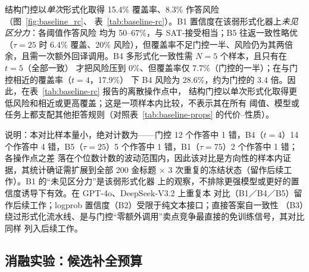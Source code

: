 \documentclass[letterpaper]{article}
\begin{document}
\begin{table}[ht]
  \centering
  \caption{代表性操作点（GPT-4o-mini，78 金标）。“样本”为所需形式化次数。}
  \label{tab:baseline-rc}
  \small
\end{table}

结构门控以\emph{单次}形式化取得 15.4\% 覆盖率、8.3\% 作答风险（图~\ref{fig:baseline_rc}、
表~\ref{tab:baseline-rc}）。B1 置信度在该弱形式化器上\emph{未见区分力}：各阈值作答风险
均为 50--67\%，与 SAT-接受相当；B5 往返一致性略优（$\tau{=}25$ 时 6.4\% 覆盖、20\%
风险），但覆盖率不足门控一半、风险仍为其两倍余，且需一次额外回译调用。B4 多形式化一致性需
$N=5$ 个样本，且只有在 $t=5$（全部一致）
才把风险压到 0\%、但覆盖率仅 7.7\%（门控的一半）；在与门控相近的覆盖率（$t=4$，17.9\%）
下 B4 风险为 28.6\%，约为门控的 3.4 倍。因此，在表~\ref{tab:baseline-rc} 报告的离散操作点中，
结构门控以单次形式化取得更低风险和相近或更高覆盖；这是一项样本内比较，不表示其在所有
阈值、模型或任务上都支配其他拒答规则（对照表~\ref{tab:baseline-props} 的代价--性质）。

说明：本对比样本量小，绝对计数为——门控 12 个作答中 1 错，B4（$t{=}4$）14 个作答中
4 错，B5（$\tau{=}25$）5 个作答中 1 错，B1（$\tau{=}75$）2 个作答中 1 错；各操作点之差
落在个位数计数的波动范围内，因此该对比是方向性的样本内证据，其统计确证需扩展到全部
200 金标题 $\times$ 3 次重复的冻结状态（留作后续工作）。B1 的“未见区分力”是该弱形式化器
上的观察，不排除更强模型或更好的置信度诱导下有效。在 GPT-4o、DeepSeek-V3.2 上重复本
对比（B1／B4／B5）留作后续工作；logprob 置信度（B2）受限于纯文本接口；直接答案自一致性
（B3）绕过形式化流水线、是与门控“零额外调用”卖点竞争最直接的免训练信号，其对比同样
列入后续工作。

\subsection{消融实验：候选补全预算}
\label{sec:budget-replay}
\end{document}
